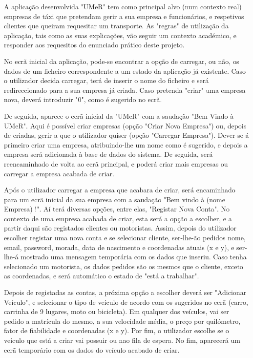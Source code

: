 \documentclass[a4paper]{article}
\begin{document}
\hspace{3mm} A aplicação desenvolvida "UMeR" tem como principal alvo (num contexto real) empresas de táxi que pretendam gerir a sua empresa e funcionários, e respetivos clientes que queiram requesitar um transporte. As "regras" de utilização da aplicação, tais como as suas explicações, vão seguir um contexto académico, e responder aos requesitos do enunciado prático deste projeto.
\par No ecrã inicial da aplicação, pode-se encontrar a opção de carregar, ou não, os dados de um ficheiro correspondente a um estado da aplicação já existente. Caso o utilizador decida carregar, terá de inserir o nome do ficheiro e será redireccionado para a sua empresa já criada. Caso pretenda "criar" uma empresa nova, deverá introduzir "0", como é sugerido no ecrã.
\par De seguida, aparece o ecrã inicial da "UMeR" com a saudação "Bem Vindo à UMeR". Aqui é possível criar empresas (opção "Criar Nova Empresa") ou, depois de criadas, gerir a que o utilizador quiser (opção "Carregar Empresa"). Dever-se-á primeiro criar uma empresa, atribuindo-lhe um nome como é sugerido, e depois a empresa será adicionada à base de dados do sistema. De seguida, será reencaminhado de volta ao ecrã principal, e poderá criar mais empresas ou carregar a empresa acabada de criar.
\par Após o utilizador carregar a empresa que acabara de criar, será encaminhado para um ecrã inicial da sua empresa com a saudação "Bem vindo à (nome Empresa) !". Aí terá diversas opções, entre elas, "Registar Nova Conta". No contexto de uma empresa acabada de criar, esta será a opção a escolher, e a partir daqui são registados clientes ou motoristas. Assim, depois do utilizador escolher registar uma nova conta e se selecionar cliente, ser-lhe-ão pedidos nome, email, password, morada, data de nascimento e coordenadas atuais (x e y), e ser-lhe-á mostrado uma mensagem temporária com os dados que inseriu. Caso tenha selecionado um motorista, os dados pedidos são os mesmos que o cliente, exceto as coordenadas, e será automático o estado de "está a trabalhar".
\par Depois de registadas as contas, a próxima opção a escolher deverá ser "Adicionar Veículo", e selecionar o tipo de veículo de acordo com os sugeridos no ecrã (carro, carrinha de 9 lugares, moto ou bicicleta). Em qualquer dos veículos, vai ser pedido a matrícula do mesmo, a sua velocidade média, o preço por quilómetro, fator de fiabilidade e coordenadas (x e y). Por fim, o utilizador escolhe se o veículo que está a criar vai possuir ou nao fila de espera. No fim, aparecerá um ecrã temporário com os dados do veículo acabado de criar.
\end{document}
